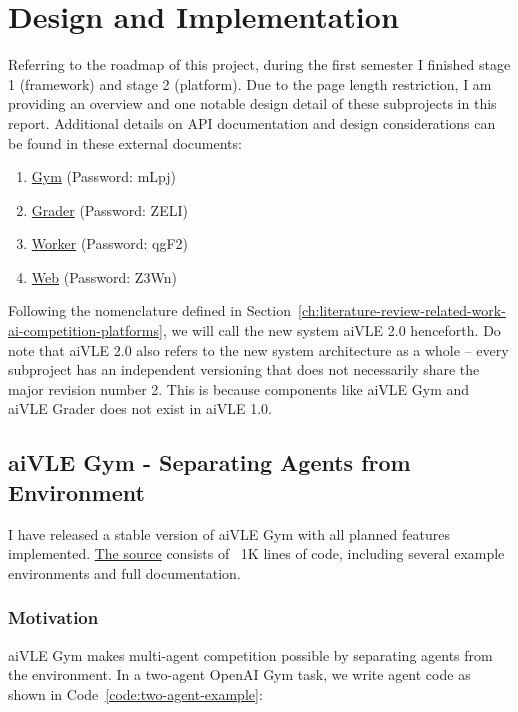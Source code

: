 \chapter{Design and Implementation}
\label{ch:design-and-impl}
Referring to the roadmap of this project, during the first semester I finished stage 1 (framework) and stage 2 (platform). Due to the page length restriction, I am providing an overview and one notable design detail of these subprojects in this report. Additional details on API documentation and design considerations can be found in these external documents:
\begin{enumerate}
    \item \href{https://yuanhong.larksuite.com/docs/docusSYdnLXZBojin39b8DGzKMT}{Gym} (Password: mLpj)
    \item \href{https://yuanhong.larksuite.com/docs/docuseeHRJWAMV3p3uL7yYCOeYx}{Grader} (Password: ZELI)
    \item \href{https://yuanhong.larksuite.com/docs/docussD8ik4yBXShA5kPyRGhgdg}{Worker} (Password: qgF2)
    \item \href{https://yuanhong.larksuite.com/docs/docusfWZk1oYG8qkEMG7y2oxkye}{Web} (Password: Z3Wn)
\end{enumerate}

Following the nomenclature defined in Section~\ref{ch:literature-review-related-work-ai-competition-platforms}, we will call the new system aiVLE 2.0 henceforth. Do note that aiVLE 2.0 also refers to the new system architecture as a whole – every subproject has an independent versioning that does not necessarily share the major revision number 2. This is because components like aiVLE Gym and aiVLE Grader does not exist in aiVLE 1.0.

\section{aiVLE Gym - Separating Agents from Environment}
\label{ch:aivle-gym}
I have released a stable version of aiVLE Gym with all planned features implemented. \href{https://github.com/edu-ai/aivle-gym}{The source} consists of ~1K lines of code, including several example environments and full documentation.

\subsection{Motivation}
aiVLE Gym makes multi-agent competition possible by separating agents from the environment. In a two-agent OpenAI Gym task, we write agent code as shown in Code~\ref{code:two-agent-example}:

